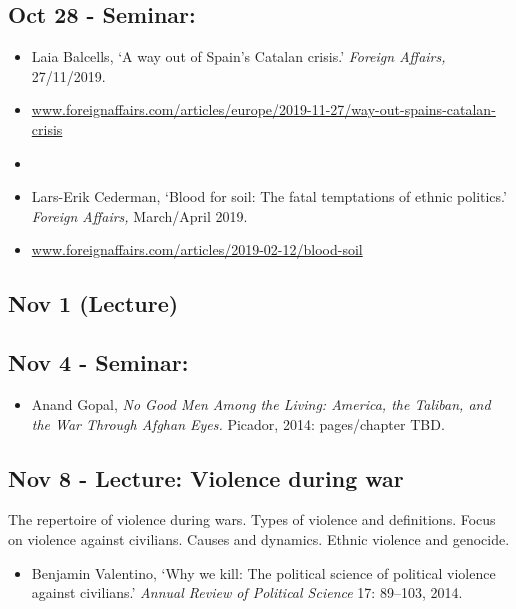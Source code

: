\documentclass[12pt, a4paper]{article}
\begin{document}
\subsection*{Oct 28 - Seminar:}

\begin{itemize}
\setlength\itemsep{-5pt}
\item Laia Balcells, `A way out of Spain's Catalan crisis.' \textit{Foreign Affairs,} 27/11/2019.
\item[] \href{https://www.foreignaffairs.com/articles/europe/2019-11-27/way-out-spains-catalan-crisis}{www.foreignaffairs.com/articles/europe/2019-11-27/way-out-spains-catalan-crisis}
\item[]
\item Lars-Erik Cederman, `Blood for soil: The fatal temptations of ethnic politics.' \textit{Foreign Affairs,} March/April 2019.
\item[] \href{https://www.foreignaffairs.com/articles/2019-02-12/blood-soil}{www.foreignaffairs.com/articles/2019-02-12/blood-soil}
\end{itemize}

\subsection*{Nov 1 (Lecture) {\color{red}{No class}}}

\subsection*{Nov 4 - Seminar:}

\begin{itemize}
\setlength\itemsep{0pt}
\item Anand Gopal, \textit{No Good Men Among the Living: America, the Taliban, and the War Through Afghan Eyes.} Picador, 2014: pages/chapter TBD.
\end{itemize}

\subsection*{Nov 8 - Lecture: Violence during war}

The repertoire of violence during wars. Types of violence and definitions. Focus on violence against civilians. Causes and dynamics. Ethnic violence and genocide.

\begin{itemize}
\setlength\itemsep{0pt}
\item Benjamin Valentino, `Why we kill: The political science of political violence against civilians.' \textit{Annual Review of Political Science} 17: 89--103, 2014.
\end{itemize}
\end{document}
